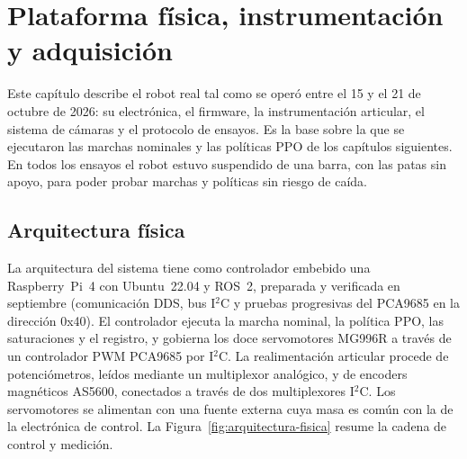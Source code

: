 \chapter{Plataforma física, instrumentación y adquisición}
\label{cap:plataforma-fisica}

Este capítulo describe el robot real tal como se operó entre el 15 y el 21 de
octubre de 2026: su electrónica, el firmware, la instrumentación articular, el
sistema de cámaras y el protocolo de ensayos. Es la base sobre la que se
ejecutaron las marchas nominales y las políticas PPO de los capítulos
siguientes. En todos los ensayos el robot estuvo suspendido de una barra, con
las patas sin apoyo, para poder probar marchas y políticas sin riesgo de caída.

\section{Arquitectura física}

La arquitectura del sistema tiene como controlador embebido una Raspberry~Pi~4
con Ubuntu~22.04 y ROS~2, preparada y verificada en septiembre (comunicación DDS,
bus I$^2$C y pruebas progresivas del PCA9685 en la dirección 0x40). El
controlador ejecuta la marcha nominal, la política PPO, las saturaciones y el
registro, y gobierna los doce servomotores MG996R a través de un controlador PWM
PCA9685 por I$^2$C. La realimentación articular procede de potenciómetros, leídos
mediante un multiplexor analógico, y de encoders magnéticos AS5600, conectados a
través de dos multiplexores I$^2$C. Los servomotores se alimentan con una fuente
externa cuya masa es común con la de la electrónica de control. La
Figura~\ref{fig:arquitectura-fisica} resume la cadena de control y medición.

